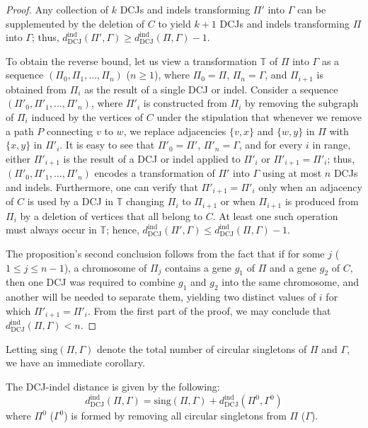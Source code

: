 \begin{proof}
Any collection of $k$ DCJs and indels transforming $\Pi'$ into $\Gamma$ can be supplemented by the deletion of $C$ to yield $k+1$ DCJs and indels transforming $\Pi$ into $\Gamma$; thus, $d_{\mathrm{DCJ}}^{\mathrm{ind}}(\Pi', \Gamma) \geq d_{\mathrm{DCJ}}^{\mathrm{ind}}(\Pi, \Gamma) - 1$.

To obtain the reverse bound, let us view a transformation $\mathbb{T}$ of $\Pi$ into $\Gamma$ as a sequence $(\Pi_0, \Pi_1, \ldots, \Pi_n)$ ($n \geq 1$), where $\Pi_0 = \Pi$, $\Pi_n = \Gamma$, and $\Pi_{i+1}$ is obtained from $\Pi_i$ as the result of a single DCJ or indel. Consider a sequence $(\Pi'_0, \Pi'_1, \ldots, \Pi'_n)$, where $\Pi'_i$ is constructed from $\Pi_i$ by removing the subgraph of $\Pi_i$ induced by the vertices of $C$ under the stipulation that whenever we remove a path $P$ connecting $v$ to $w$, we replace adjacencies $\{v, x\}$ and $\{w, y\}$ in $\Pi$ with $\{x, y\}$ in $\Pi'_i$.  It is easy to see that $\Pi'_0 = \Pi'$, $\Pi'_n = \Gamma$, and for every $i$ in range, either $\Pi'_{i+1}$ is the result of a DCJ or indel applied to $\Pi'_i$ or $\Pi'_{i+1} = \Pi'_i$; thus, $(\Pi'_0, \Pi'_1, \ldots, \Pi'_n)$ encodes a transformation of $\Pi'$ into $\Gamma$ using at most $n$ DCJs and indels.  Furthermore, one can verify that $\Pi'_{i+1} = \Pi'_i$ only when an adjacency of $C$ is used by a DCJ in $\mathbb{T}$ changing $\Pi_i$ to $\Pi_{i+1}$ or when $\Pi_{i+1}$ is produced from $\Pi_i$ by a deletion of vertices that all belong to $C$.  At least one such operation must always occur in $\mathbb{T}$; hence, $d_{\mathrm{DCJ}}^{\mathrm{ind}}(\Pi', \Gamma) \leq d_{\mathrm{DCJ}}^{\mathrm{ind}}(\Pi, \Gamma) - 1$.

The proposition's second conclusion follows from the fact that if for some $j$ ($1 \leq j \leq n-1$), a chromosome of $\Pi_j$ contains a gene $g_1$ of $\Pi$ and a gene $g_2$ of $C$, then one DCJ was required to combine $g_1$ and $g_2$ into the same chromosome, and another will be needed to separate them, yielding two distinct values of $i$ for which $\Pi'_{i+1} = \Pi'_i$.  From the first part of the proof, we may conclude that $d_{\mathrm{DCJ}}^{\mathrm{ind}}(\Pi, \Gamma) < n$. 

\end{proof}

Letting $\mathrm{sing}(\Pi, \Gamma)$ denote the total number of circular singletons of $\Pi$ and $\Gamma$, we have an immediate corollary.

\begin{corollary}
The DCJ-indel distance is given by the following:
\begin{equation}
d_{\mathrm{DCJ}}^{\mathrm{ind}}(\Pi, \Gamma) = \mathrm{sing}(\Pi, \Gamma) + d_{\mathrm{DCJ}}^{\mathrm{ind}}(\Pi^0, \Gamma^0)
\end{equation}
where $\Pi^0$ ($\Gamma^0$) is formed by removing all circular singletons from $\Pi$ ($\Gamma$).
\label{Corollary: Eliminating Circular Singletons}
\end{corollary}

